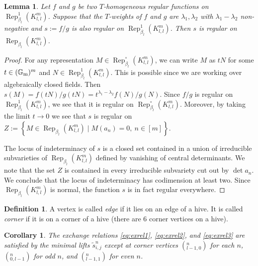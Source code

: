 \documentclass{amsart}
\newtheorem{lemma}[theorem]{Lemma}
\newtheorem{corollary}[theorem]{Corollary}
\theoremstyle{definition}
\newtheorem{definition}[theorem]{Definition}
\theoremstyle{remark}
\numberwithin{equation}{section}
\DeclareMathOperator{\Rep}{Rep}
\newcommand{\mb}[1]{\mathbb{#1}}
\newcommand{\wtd}[1]{\widetilde{#1}}
\newcommand{\kllm}{{K_{l,l}^m}}
\newcommand{\bl}{{\beta_l}}
\newcommand{\ijn}{_{i,j}^{n}}
\begin{document}
\begin{lemma} \label{L:regquotient} Let $f$ and $g$ be two $T$-homogeneous regular functions on $\Rep_{\bl}^1(\kllm)$.
	Suppose that the $T$-weights of $f$ and $g$ are $\lambda_1,\lambda_2$ with $\lambda_1-\lambda_2$ non-negative
	and $s:=f/g$ is also regular on $\Rep_{\bl}^1(\kllm)$.
Then $s$ is regular on $\Rep_{\bl}(\kllm)$.
\end{lemma}

\begin{proof} For any representation $M\in \Rep_{\bl}^\circ(\kllm)$, we can write $M$ as $tN$ for some $t\in (\mb{G}_{\rm m})^m$ and $N\in \Rep_{\bl}^1(\kllm)$.
	This is possible since we are working over algebraically closed fields.
	Then $s(M)=f(tN)/g(tN)=t^{\lambda_1-\lambda_2}f(N)/g(N)$.
	Since $f/g$ is regular on $\Rep_{\bl}^1(\kllm)$, we see that it is regular on $\Rep_{\bl}^\circ(\kllm)$.
Moreover, by taking the limit $t\to 0$ we see that $s$ is regular on $Z:=\left\{M\in\Rep_\bl(\kllm)\mid M(a_n)=0,\ n\in[m] \right\}$.
	
The locus of indeterminacy of $s$ is a closed set contained in a union of irreducible subvarieties of $\Rep_{\bl}(\kllm)$ defined by vanishing of central determinants.
We note that the set $Z$ is contained in every irreducible subvariety cut out by $\det a_n$.
We conclude that the locus of indeterminacy has codimension at least two.
Since $\Rep_{\bl}(\kllm)$ is normal, the function $s$ is in fact regular everywhere.
\end{proof}

\begin{definition} A vertex is called {\em edge} if it lies on an edge of a hive.
It is called {\em corner} if it is on a corner of a hive (there are 6 corner vertices on a hive).
\end{definition}

\begin{corollary} \label{C:exrellift1}
	The exchange relations \eqref{eq:exrel1}, \eqref{eq:exrel2}, and \eqref{eq:exrel3} are satisfied by the minimal lifts $\wtd{s}\ijn$ except at corner vertices $(_{l-1,0}^n)$ for each $n$, $(_{0,l-1}^n)$ for odd $n$, and $(_{l-1,1}^n)$ for even $n$.
\end{corollary}
\end{document}
